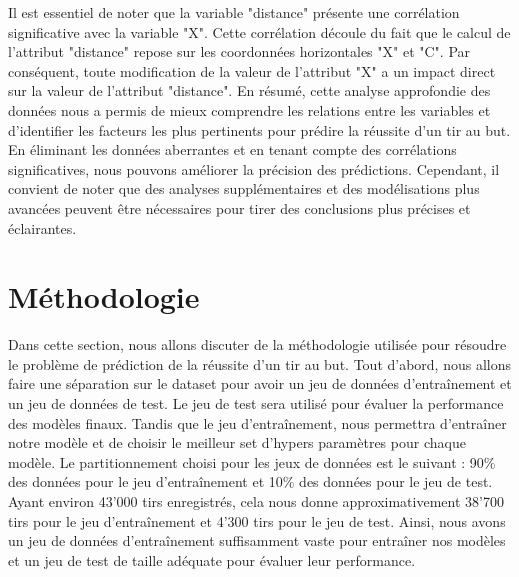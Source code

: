 \documentclass[12pt]{article}
\begin{document}
Il est essentiel de noter que la variable "distance" présente une corrélation significative avec la variable "X".
Cette corrélation découle du fait que le calcul de l'attribut "distance" repose sur les coordonnées horizontales "X" et "C".
Par conséquent, toute modification de la valeur de l'attribut "X" a un impact direct sur la valeur de l'attribut "distance".
\newline\newline
En résumé, cette analyse approfondie des données nous a permis de mieux comprendre les relations entre les variables et d'identifier les facteurs les plus pertinents pour prédire la réussite d'un tir au but.
En éliminant les données aberrantes et en tenant compte des corrélations significatives, nous pouvons améliorer la précision des prédictions.
Cependant, il convient de noter que des analyses supplémentaires et des modélisations plus avancées peuvent être nécessaires pour tirer des conclusions plus précises et éclairantes.

\newpage

\section{Méthodologie}
\label{sec:methodologie}
Dans cette section, nous allons discuter de la méthodologie utilisée pour résoudre le problème de prédiction de la réussite d'un tir au but.
Tout d'abord, nous allons faire une séparation sur le dataset pour avoir un jeu de données d'entraînement et un jeu de données de test.
Le jeu de test sera utilisé pour évaluer la performance des modèles finaux.
Tandis que le jeu d'entraînement, nous permettra d'entraîner notre modèle et de choisir le meilleur set d'hypers paramètres pour chaque modèle.
Le partitionnement choisi pour les jeux de données est le suivant : 90\% des données pour le jeu d'entraînement et 10\% des données pour le jeu de test.
Ayant environ 43'000 tirs enregistrés, cela nous donne approximativement 38'700 tirs pour le jeu d'entraînement et 4'300 tirs pour le jeu de test.
Ainsi, nous avons un jeu de données d'entraînement suffisamment vaste pour entraîner nos modèles et un jeu de test de taille adéquate pour évaluer leur performance.
\end{document}

